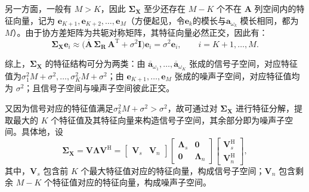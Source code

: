 另一方面，一般有 \(M > K\)，因此 \(\mathbf{\Sigma}_{\mathbf{X}}\) 至少还存在 \(M-K\) 个不在 \(\mathbf{A}\) 列空间内的特征向量，记为 \(\bm{e}_{K+1},\bm{e}_{K+2},\dots,\bm{e}_M\)（方便起见，令\( \bm{e}_k \)的模长与\( \bm{a}_{\omega_k}\) 模长相同，都为\( M \)）。由于协方差矩阵为共轭对称矩阵，其特征向量必然正交，因此有：
\[
    \mathbf{\Sigma}_{\mathbf{X}} \bm{e}_i
    \approx \big(\overline{\mathbf{A}}\,\mathbf{\Sigma}_{\mathbf{R}}\,\mathbf{A}^{\mathrm{T}} + \sigma^2 \mathbf{I}\big)\bm{e}_i
    = \sigma^2 \bm{e}_i,\qquad i=K+1,\dots,M.
\]

综上，\(\mathbf{\Sigma}_{\mathbf{X}}\) 的特征结构可分为两类：由 \(\overline{\bm{a}}_{\omega_1},\dots,\overline{\bm{a}}_{\omega_K}\) 张成的信号子空间，对应特征值为\(\sigma_1^2 M+\sigma^2,\dots,\sigma_K^2 M+\sigma^2\)；由 \(\bm{e}_{K+1},\dots,\bm{e}_M\) 张成的噪声子空间，对应特征值均为 \(\sigma^2\)；且信号子空间与噪声子空间彼此正交。

又因为信号对应的特征值满足\(\sigma_k^2 M + \sigma^2 > \sigma^2\)，故可通过对 \(\mathbf{\Sigma}_{\mathbf{X}}\) 进行特征分解，提取最大的 \(K\) 个特征值及其特征向量来构造信号子空间，其余部分即为噪声子空间。具体地，设
\[
    \mathbf{\Sigma}_{\mathbf{X}}
    = \mathbf{V}\mathbf{\Lambda}\mathbf{V}^{\mathrm{H}}
    = \begin{bmatrix}
        \mathbf{V}_{s} & \mathbf{V}_{n}
    \end{bmatrix}
    \begin{bmatrix}
        \mathbf{\Lambda}_{s} & \mathbf{0}           \\
        \mathbf{0}           & \mathbf{\Lambda}_{n}
    \end{bmatrix}
    \begin{bmatrix}
        \mathbf{V}_{s}^{\mathrm{H}} \\
        \mathbf{V}_{n}^{\mathrm{H}}
    \end{bmatrix},
\]
其中，\(\mathbf{V}_{s}\) 包含前 \(K\) 个最大特征值对应的特征向量，构成信号子空间；\(\mathbf{V}_{n}\) 包含剩余 \(M-K\) 个特征值对应的特征向量，构成噪声子空间。

